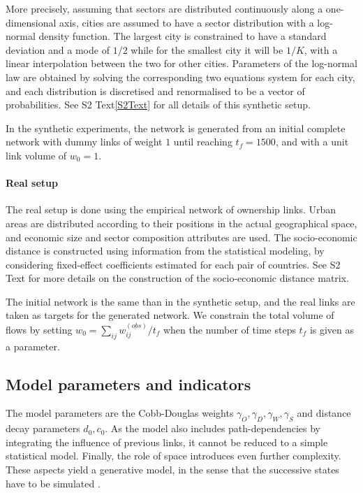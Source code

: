 \documentclass[10pt,letterpaper]{article}
\begin{document}
More precisely, assuming that sectors are distributed continuously along a one-dimensional axis, cities are assumed to have a sector distribution with a log-normal density function. The largest city is constrained to have a standard deviation and a mode of $1/2$ while for the smallest city it will be $1/K$, with a linear interpolation between the two for other cities. Parameters of the log-normal law are obtained by solving the corresponding two equations system for each city, and each distribution is discretised and renormalised to be a vector of probabilities. See S2 Text\ref{S2Text} for all details of this synthetic setup.

In the synthetic experiments, the network is generated from an initial complete network with dummy links of weight $1$ until reaching $t_f=1500$, and with a unit link volume of $w_0 = 1$.

     
\paragraph{Real setup}

The real setup is done using the empirical network of ownership links. Urban areas are distributed according to their positions in the actual geographical space, and economic size and sector composition attributes are used. The socio-economic distance is constructed using information from the statistical modeling, by considering fixed-effect coefficients estimated for each pair of countries. See S2 Text for more details on the construction of the socio-economic distance matrix.

The initial network is the same than in the synthetic setup, and the real links are taken as targets for the generated network. We constrain the total volume of flows by setting $w_0 = \sum_{ij} w_{ij}^{(obs)} / t_{f}$ when the number of time steps $t_f$ is given as a parameter.

\subsection*{Model parameters and indicators}

The model parameters are the Cobb-Douglas weights $\gamma_O,\gamma_D,\gamma_W,\gamma_S$ and distance decay parameters $d_0,c_0$. As the model also includes path-dependencies by integrating the influence of previous links, it cannot be reduced to a simple statistical model. Finally, the role of space introduces even further complexity. These aspects yield a generative model, in the sense that the successive states have to be simulated \cite{epstein1999agent}.
\end{document}
